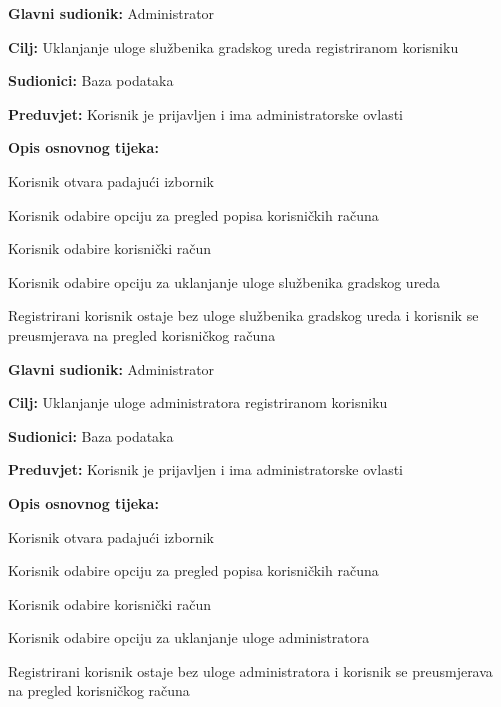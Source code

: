 \noindent {}
\begin{packed_item}

	\item \textbf{Glavni sudionik: }Administrator
	\item  \textbf{Cilj:} Uklanjanje uloge službenika gradskog ureda registriranom korisniku
	\item  \textbf{Sudionici:} Baza podataka
	\item  \textbf{Preduvjet:} Korisnik je prijavljen i ima administratorske ovlasti
	\item  \textbf{Opis osnovnog tijeka:}

	\item[] \begin{packed_enum}

		\item Korisnik otvara padajući izbornik 
		\item Korisnik odabire opciju za pregled popisa korisničkih računa
		\item Korisnik odabire korisnički račun
		\item Korisnik odabire opciju za uklanjanje uloge službenika gradskog ureda
		\item Registrirani korisnik ostaje bez uloge službenika gradskog ureda i korisnik se preusmjerava na pregled korisničkog računa
	\end{packed_enum}
\end{packed_item}


\noindent {}
\begin{packed_item}

	\item \textbf{Glavni sudionik: }Administrator
	\item  \textbf{Cilj:} Uklanjanje uloge administratora registriranom korisniku
	\item  \textbf{Sudionici:} Baza podataka
	\item  \textbf{Preduvjet:} Korisnik je prijavljen i ima administratorske ovlasti
	\item  \textbf{Opis osnovnog tijeka:}

	\item[] \begin{packed_enum}

		\item Korisnik otvara padajući izbornik 
		\item Korisnik odabire opciju za pregled popisa korisničkih računa
		\item Korisnik odabire korisnički račun
		\item Korisnik odabire opciju za uklanjanje uloge administratora
		\item Registrirani korisnik ostaje bez uloge administratora i korisnik se preusmjerava na pregled korisničkog računa
	\end{packed_enum}
\end{packed_item}


